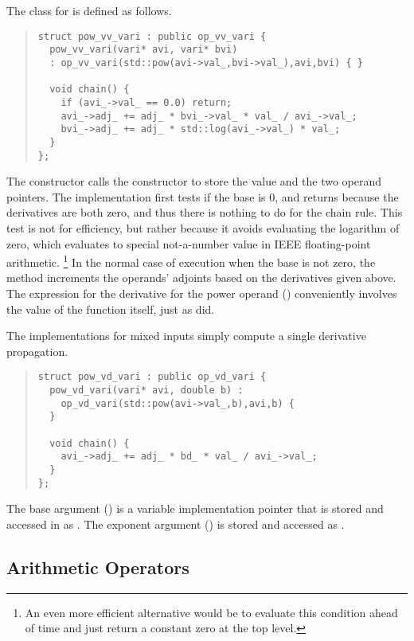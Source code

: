 \documentclass[10pt]{article}
\begin{document}
The  class for  is defined as follows.
%
\begin{quote}
\begin{Verbatim}
struct pow_vv_vari : public op_vv_vari {
  pow_vv_vari(vari* avi, vari* bvi)
  : op_vv_vari(std::pow(avi->val_,bvi->val_),avi,bvi) { }

  void chain() {
    if (avi_->val_ == 0.0) return; 
    avi_->adj_ += adj_ * bvi_->val_ * val_ / avi_->val_;
    bvi_->adj_ += adj_ * std::log(avi_->val_) * val_;
  }
};
\end{Verbatim}
\end{quote}
%
The constructor calls the  constructor to store the
value and the two operand pointers.  The  implementation
first tests if the base is 0, and returns because the derivatives are
both zero, and thus there is nothing to do for the chain rule.  This
test is not for efficiency, but rather because it avoids evaluating
the logarithm of zero, which evaluates to special not-a-number value
in IEEE floating-point arithmetic.%
%
\footnote{An even more efficient alternative
would be to evaluate this condition ahead of time and just return a
constant zero  at the top level.}
%
In the normal case of execution when the base is not zero, the
 method increments the operands' adjoints based on the
derivatives given above.  The expression for the derivative for the
power operand () conveniently involves the value of the
function itself, just as  did.

The implementations for mixed inputs simply compute a single
derivative propagation.
%
\begin{quote}
\begin{Verbatim}
struct pow_vd_vari : public op_vd_vari {
  pow_vd_vari(vari* avi, double b) :
    op_vd_vari(std::pow(avi->val_,b),avi,b) {
  }

  void chain() {
    avi_->adj_ += adj_ * bd_ * val_ / avi_->val_;
  }
};
\end{Verbatim}
\end{quote}
%
The base argument () is a variable implementation pointer
that is stored and accessed in  as .  The
exponent argument () is stored and accessed as .  


\subsection{Arithmetic Operators}
\end{document}
